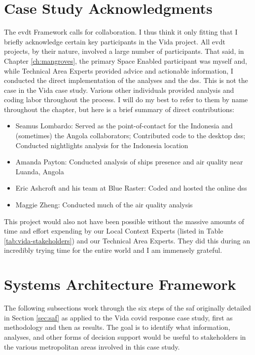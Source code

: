 \section{Case Study Acknowledgments}

The \ac{evdt} Framework calls for collaboration. I thus think it only fitting that I briefly acknowledge certain key participants in the Vida project. All \ac{evdt} projects, by their nature, involved a large number of participants. That said, in Chapter \ref{ch:mangroves}, the primary Space Enabled participant was myself and, while Technical Area Experts provided advice and actionable information, I conducted the direct implementation of the analyses and the \ac{dss}. This is not the case in the Vida case study. Various other individuals provided analysis and coding labor throughout the process. I will do my best to refer to them by name throughout the chapter, but here is a brief summary of direct contributions:

\begin{itemize}[itemsep=0pt,parsep=0pt]
	\item{Seamus Lombardo: Served as the point-of-contact for the Indonesia and (sometimes) the Angola collaborators; Contributed code to the desktop \ac{dss}; Conducted nightlights analysis for the Indonesia location}
	\item{Amanda Payton: Conducted analysis of ships presence and air quality near Luanda, Angola}
	\item{Eric Ashcroft and his team at Blue Raster: Coded and hosted the online \ac{dss}}
	\item{Maggie Zheng: Conducted much of the air quality analysis}
\end{itemize}

This project would also not have been possible without the massive amounts of time and effort expending by our Local Context Experts (listed in Table \ref{tab:vida-stakeholders}) and our Technical Area Experts. They did this during an incredibly trying time for the entire world and I am immensely grateful.


\section{Systems Architecture Framework} \label{sec:vida-saf}

The following subsections work through the six steps of the \ac{saf} originally detailed in Section \ref{sec:saf} as applied to the Vida \ac{covid} response case study, first as methodology and then as results. The goal is to identify what information, analyses, and other forms of decision support would be useful to stakeholders in the various metropolitan areas involved in this case study.

